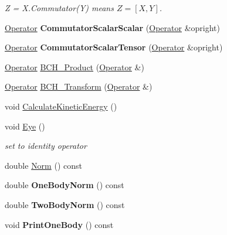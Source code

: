 \begin{DoxyCompactItemize}
\begin{DoxyCompactList}\small\item\em Z = X.\-Commutator(\-Y) means $ Z = [X,Y] $. \end{DoxyCompactList}\item 
\hypertarget{classOperator_a55b95477ad8674877eb4d15491cfe9a0}{\hyperlink{classOperator}{Operator} {\bfseries Commutator\-Scalar\-Scalar} (\hyperlink{classOperator}{Operator} \&opright)}\label{classOperator_a55b95477ad8674877eb4d15491cfe9a0}

\item 
\hypertarget{classOperator_a7db0372f91cffc85b293f7750c72944a}{\hyperlink{classOperator}{Operator} {\bfseries Commutator\-Scalar\-Tensor} (\hyperlink{classOperator}{Operator} \&opright)}\label{classOperator_a7db0372f91cffc85b293f7750c72944a}

\item 
\hyperlink{classOperator}{Operator} \hyperlink{classOperator_a6a91cd02db723ee28b7532e6af029033}{B\-C\-H\-\_\-\-Product} (\hyperlink{classOperator}{Operator} \&)
\item 
\hyperlink{classOperator}{Operator} \hyperlink{classOperator_adc5537604f6b71121163370aca79dfef}{B\-C\-H\-\_\-\-Transform} (\hyperlink{classOperator}{Operator} \&)
\item 
void \hyperlink{classOperator_a701c64f8be794e89fd28a643b56d534a}{Calculate\-Kinetic\-Energy} ()
\item 
\hypertarget{classOperator_a03a378f0da2fe71d8160bd3262891457}{void \hyperlink{classOperator_a03a378f0da2fe71d8160bd3262891457}{Eye} ()}\label{classOperator_a03a378f0da2fe71d8160bd3262891457}

\begin{DoxyCompactList}\small\item\em set to identity operator \end{DoxyCompactList}\item 
double \hyperlink{classOperator_acb9d7959232a636191b91f6bf5b7b0c8}{Norm} () const 
\item 
\hypertarget{classOperator_a72dc7aea85c7775097d235de6f17f330}{double {\bfseries One\-Body\-Norm} () const }\label{classOperator_a72dc7aea85c7775097d235de6f17f330}

\item 
\hypertarget{classOperator_af1c40bdef64ec9abd5d95e8328565a67}{double {\bfseries Two\-Body\-Norm} () const }\label{classOperator_af1c40bdef64ec9abd5d95e8328565a67}

\item 
\hypertarget{classOperator_a5ec5a8110337108ac31d3af7337e454b}{void {\bfseries Print\-One\-Body} () const }\label{classOperator_a5ec5a8110337108ac31d3af7337e454b}


\end{DoxyCompactItemize}

